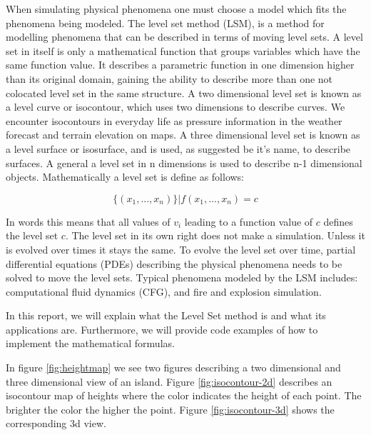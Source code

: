 When simulating physical phenomena one must choose a model which fits
the phenomena being modeled. The level set method (LSM), is a method
for modelling phenomena that can be described in terms of moving level
sets.
%
A level set in itself is only a mathematical function that groups
variables which have the same function value. It describes a
parametric function in one dimension higher than its original domain,
gaining the ability to describe more than one not colocated level set
in the same structure.
%
A two dimensional level set is known as a level curve or isocontour,
which uses two dimensions to describe curves. We encounter isocontours
in everyday life as pressure information in the weather forecast and
terrain elevation on maps.
%
A three dimensional level set is
known as a level surface or isosurface, and is used, as suggested be
it's name, to describe surfaces.  A general a level set in n
dimensions is used to describe n-1 dimensional objects. Mathematically
a level set is define as follows:

\begin{equation}
\{ (x_1,...,x_n) \} | f(x_1,...,x_n) = c
\end{equation}

In words this means that all values of $v_i$ leading to a function
value of $c$ defines the level set $c$.
%
The level set in its own right does not make a simulation. Unless it
is evolved over times it stays the same. To evolve the level set over
time, partial differential equations (PDEs) describing the physical
phenomena needs to be solved to move the level sets.
%
Typical phenomena modeled by the LSM includes: computational fluid
dynamics (CFG), and fire and explosion simulation. 

In this report, we will explain what the Level Set method is and what
its applications are. Furthermore, we will provide code examples of
how to implement the mathematical formulas.

In figure \vref{fig:heightmap} we see two figures describing a two dimensional and
three dimensional view of an island. Figure \vref{fig:isocontour-2d} describes an
isocontour map of heights where the color indicates the height of each
point. The brighter the color the higher the point. Figure
\vref{fig:isocontour-3d} shows the corresponding 3d view.

